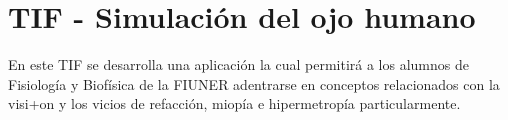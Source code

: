 \chapter{TIF -\/ Simulación del ojo humano}
\hypertarget{md__c_1_2_repositorio_t_i_f_2_software_2_r_e_a_d_m_e}{}\label{md__c_1_2_repositorio_t_i_f_2_software_2_r_e_a_d_m_e}
\label{md__c_1_2_repositorio_t_i_f_2_software_2_r_e_a_d_m_e_autotoc_md0}%
%
 En este TIF se desarrolla una aplicación la cual permitirá a los alumnos de Fisiología y Biofísica de la FIUNER adentrarse en conceptos relacionados con la visi+on y los vicios de refacción, miopía e hipermetropía particularmente. ~\newline
 